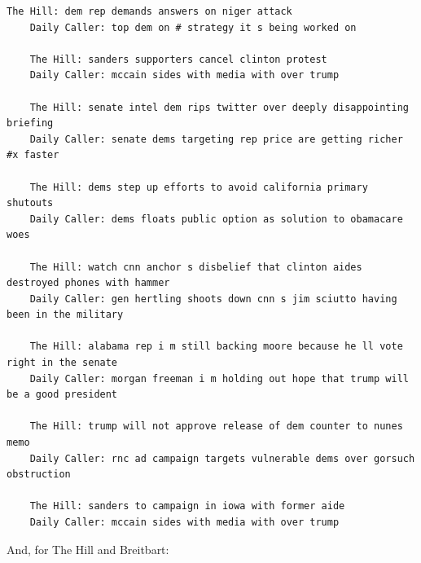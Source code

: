\documentclass{scrartcl}
\begin{document}
\begin{lstlisting}[basicstyle=\tiny\hlfont]
    The Hill: dem rep demands answers on niger attack
    Daily Caller: top dem on # strategy it s being worked on

    The Hill: sanders supporters cancel clinton protest
    Daily Caller: mccain sides with media with over trump

    The Hill: senate intel dem rips twitter over deeply disappointing briefing
    Daily Caller: senate dems targeting rep price are getting richer #x faster

    The Hill: dems step up efforts to avoid california primary shutouts
    Daily Caller: dems floats public option as solution to obamacare woes

    The Hill: watch cnn anchor s disbelief that clinton aides destroyed phones with hammer
    Daily Caller: gen hertling shoots down cnn s jim sciutto having been in the military

    The Hill: alabama rep i m still backing moore because he ll vote right in the senate
    Daily Caller: morgan freeman i m holding out hope that trump will be a good president

    The Hill: trump will not approve release of dem counter to nunes memo
    Daily Caller: rnc ad campaign targets vulnerable dems over gorsuch obstruction

    The Hill: sanders to campaign in iowa with former aide
    Daily Caller: mccain sides with media with over trump
\end{lstlisting}

And, for The Hill and Breitbart:
\end{document}

